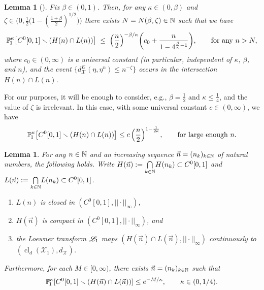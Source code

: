 \documentclass[a4paper, 11pt]{article}
\newtheorem{lem}[thm]{Lemma}
\newtheorem{lemA}[theorem]{Lemma}
\theoremstyle{definition}
\numberwithin{equation}{section}
\numberwithin{figure}{section}
\newcommand{\cLoewnerTransform}[1][]{\mathscr{L}_{\ifx&#1&\else#1\fi}}
\newcommand{\funs}[2][]{C^{0}_{#1}[0,#2}
\newcommand{\Hpaths}[1][]{\mathscr{X}_{#1}} %
\newcommand{\Hpathscl}[1][]{\operatorname{cl}_{d}(\Hpaths[#1])}
\newcommand{\norm}[1]{|\!|#1|\!|}
\newcommand{\normUniform}[1]{\norm{#1}_\infty}
\newcommand{\dHpaths}[1][]{d_{\!\Hpaths[#1]}}
\newcommand{\dHpathsEucl}{d_{\!\Hpaths[]}^E}
\newcommand{\BMmeasure}[2][]{\bP^{#2}_{\!#1}}
\begin{document}
\begin{lemA} [{\cite[Proposition~5.1]{Guskov:LPD_for_SLE_in_the_uniform_topology}}] 
\label{thm:chordal-event}
Fix $\beta \in (0,1)$. 
Then, for any $\kappa \in (0, \beta)$ and $\zeta \in \big(0, \frac{1}{2}\big(1-(\tfrac{1+\beta}{2})^{1/2}\big)\big)$ 
there exists $N = N(\beta,\zeta) \in \mathbb{N}$ such that we have
\begin{align*}
\BMmeasure[1]{\kappa}\big[ \funs{1]} \smallsetminus (H(n) \cap L(n)) \big] 
\; \le \; \Big( \frac{n}{2} \Big)^{-\beta/\kappa} \bigg( c_0 + \frac{n}{1-4^{\frac{\beta}{\kappa}-1}} \bigg) ,
\qquad \textnormal{for any } n > N , 
\end{align*}
where $c_0 \in (0,\infty)$ is a universal constant 
\textnormal{(}in particular, independent of $\kappa$, $\beta$, and $n$\textnormal{)},
and the event $\{\dHpathsEucl(\eta, \eta^n) \le n^{-\zeta}\}$ occurs in the intersection $H(n) \cap L(n)$. 
\end{lemA}


For our purposes, it will be enough to consider, e.g., 
$\beta = \frac{1}{2}$ and $\kappa \le \frac{1}{4}$, 
and the value of $\zeta$ is irrelevant.
In this case, with some universal constant $c \in (0,\infty)$, we have 
\begin{align}\label{eqn:continuity-probability-estimate}
\BMmeasure[1]{\kappa}\big[ \funs{1]} \smallsetminus (H(n) \cap L(n)) \big] \le c \, \Big( \frac{n}{2} \Big)^{1-\frac{1}{2\kappa}},
\qquad \textnormal{for large enough } n .
\end{align}


\begin{lem} \label{thm:compact-sets}
For any $n \in \mathbb{N}$ and an increasing sequence $\vec n = (n_k)_{k \in \mathbb{N}}$ of natural numbers, the following holds.
Write $H(\vec n) := \underset{k \in \bN}{\bigcap} H(n_k) \subset \funs{1]}$ and $L(\vec n) := \underset{k \in \bN}{\bigcap} L(n_k) \subset \funs{1]}$.
\begin{enumerate}[leftmargin=*, label=\textnormal{(\roman*)}]
\item $L(n)$ is closed in $(\funs{1]},\normUniform{\cdot})$, 
\item $H(\vec n)$ is compact in $(\funs{1]},\normUniform{\cdot})$, and
\item\label{item:continuity} 
the Loewner transform $\cLoewnerTransform[1]$ maps 
$(H(\vec n) \cap L(\vec n),\normUniform{\cdot})$ continuously to $(\Hpathscl[1],\dHpaths)$.
\end{enumerate}
Furthermore, for each $M \in [0,\infty)$, there exists $\vec n = (n_k)_{k \in \mathbb{N}}$ such that
\begin{align} \label{eq:HL_bound}
\BMmeasure[1]{\kappa}[ \funs{1]} \smallsetminus (H(\vec n) \cap L(\vec n))] \le e^{-M/\kappa}, \qquad \kappa \in (0, 1/4).
\end{align}
\end{lem}
\end{document}
